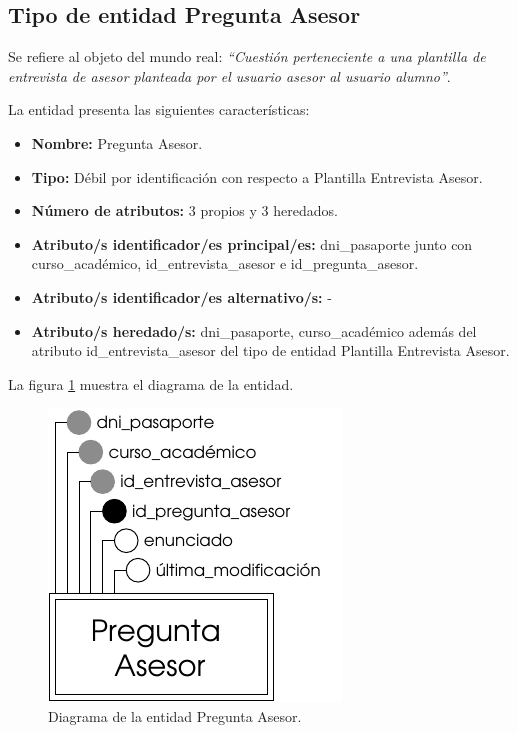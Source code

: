 \subsection{Tipo de entidad Pregunta Asesor}

   \begin{description}

   \item[Definición] Se refiere al objeto del mundo real: \emph{``Cuestión
   perteneciente a una plantilla de entrevista de asesor planteada por el
   usuario asesor al usuario alumno''}.

   \item[Características] La entidad presenta las siguientes características:
      \begin{itemize}
         \item \textbf{Nombre:} Pregunta Asesor.
         \item \textbf{Tipo:} Débil por identificación con respecto a
         Plantilla Entrevista Asesor.
         \item \textbf{Número de atributos:} 3 propios y 3 heredados.
         \item \textbf{Atributo/s identificador/es principal/es:} dni\_pasaporte
         junto con curso\_académico, id\_entrevista\_asesor e id\_pregunta\_asesor.
         \item \textbf{Atributo/s identificador/es alternativo/s:} -
         \item \textbf{Atributo/s heredado/s:} dni\_pasaporte, curso\_académico
         además del atributo id\_entrevista\_asesor del tipo de entidad
         Plantilla Entrevista Asesor.
      \end{itemize}

   \item[Diagrama] La figura \ref{diagramaPregAse} muestra el diagrama de la entidad.
   \item \begin{figure}[!ht]
            \begin{center}
            \includegraphics[]{07.Modelo_Entidad-Interrelacion/7.2.Analisis_Entidades/diagramas/preg_ase.pdf}
            \caption{Diagrama de la entidad Pregunta Asesor.}
            \label{diagramaPregAse}
            \end{center}
         \end{figure}


\end{description}
